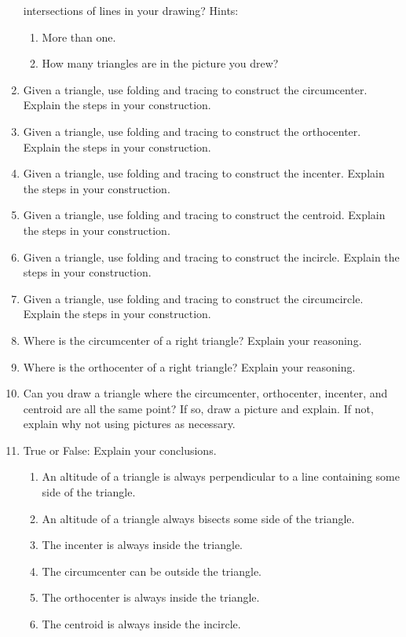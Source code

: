 \begin{enumerate}
  intersections of lines in your drawing? Hints:
\begin{enumerate}
\item More than one.
\item How many triangles are in the picture you drew?
\end{enumerate}
\item Given a triangle, use folding and tracing to construct the circumcenter. Explain the steps
  in your construction.
\item Given a triangle, use folding and tracing to construct the orthocenter. Explain the steps
  in your construction.
\item Given a triangle, use folding and tracing to construct the incenter. Explain the steps in
  your construction.
\item Given a triangle, use folding and tracing to construct the centroid. Explain the steps in
  your construction.
\item Given a triangle, use folding and tracing to construct the incircle. Explain the steps in
  your construction.
\item Given a triangle, use folding and tracing to construct the circumcircle. Explain the steps
  in your construction.
\item Where is the circumcenter of a right triangle? Explain your
  reasoning.
\item Where is the orthocenter of a right triangle? Explain your
  reasoning.
\item Can you draw a triangle where the circumcenter, orthocenter,
  incenter, and centroid are all the same point?  If so, draw a
  picture and explain. If not, explain why not using pictures as
  necessary.
\item True or False: Explain your conclusions.
\begin{enumerate}
\item An altitude of a triangle is always perpendicular to a line
  containing some side of the triangle.
\item An altitude of a triangle always bisects some side of the
  triangle.
\item The incenter is always inside the triangle.
\item The circumcenter can be outside the triangle.
\item The orthocenter is always inside the triangle.
\item The centroid is always inside the incircle.

\end{enumerate}
\end{enumerate}
